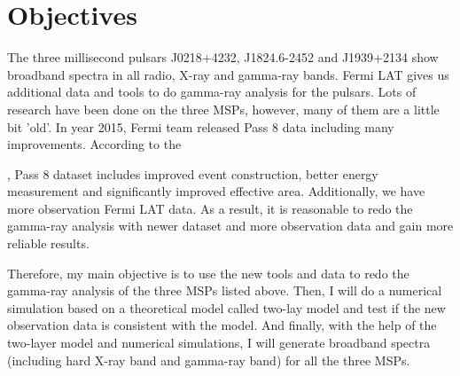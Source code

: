\documentclass[12pt]{report}
\newcommand{\blackhref}[2]{
  \href{#1}{\color{black}{\textit{\small #2}}}
}
\begin{document}
    \section{Objectives}
            The three millisecond pulsars J0218+4232, J1824.6-2452 and J1939+2134 show 
            broadband spectra in all radio, X-ray and gamma-ray bands. Fermi LAT gives us 
            additional data and tools to do gamma-ray analysis for the pulsars. Lots of research 
            have been done on the three MSPs, however, many of them are a little bit 'old'. In year 
            2015, Fermi team released Pass 8 data including many improvements. According to the 
            \blackhref{https://fermi.gsfc.nasa.gov/ssc/data/analysis/documentation/Pass8_usage.html}{Fermi official website},
            Pass 8 dataset includes improved event construction, better energy measurement and 
            significantly improved effective area. Additionally, we have more observation Fermi LAT
            data. As a result, it is reasonable to redo the gamma-ray analysis with newer dataset and 
            more observation data and gain more reliable results. 

            Therefore, my main objective is to use the new tools and data to redo the gamma-ray
            analysis of the three MSPs listed above. 
            Then, I will do a numerical simulation based on a theoretical model called two-lay model and test if the new observation 
            data is consistent with the model. And finally, with the help of the two-layer model
            and numerical simulations, I will generate broadband spectra (including hard X-ray band 
            and gamma-ray band) for all the three MSPs. 

              
\end{document}
